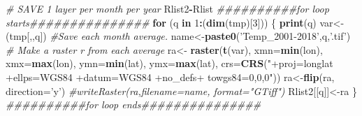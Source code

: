 \documentclass[
  10pt,
  b5paper,
]{book}
\newenvironment{Shaded}{\begin{snugshade}}{\end{snugshade}}
\newcommand{\CommentTok}[1]{\textcolor[rgb]{0.56,0.35,0.01}{\textit{#1}}}
\newcommand{\ControlFlowTok}[1]{\textcolor[rgb]{0.13,0.29,0.53}{\textbf{#1}}}
\newcommand{\DataTypeTok}[1]{\textcolor[rgb]{0.13,0.29,0.53}{#1}}
\newcommand{\DecValTok}[1]{\textcolor[rgb]{0.00,0.00,0.81}{#1}}
\newcommand{\KeywordTok}[1]{\textcolor[rgb]{0.13,0.29,0.53}{\textbf{#1}}}
\newcommand{\NormalTok}[1]{#1}
\newcommand{\OperatorTok}[1]{\textcolor[rgb]{0.81,0.36,0.00}{\textbf{#1}}}
\newcommand{\StringTok}[1]{\textcolor[rgb]{0.31,0.60,0.02}{#1}}
\begin{document}
\begin{Shaded}
\begin{Highlighting}[]
 \CommentTok{# SAVE 1 layer per month per year}
\NormalTok{ Rlist2}\OperatorTok{-}\NormalTok{Rlist}
\CommentTok{##########for loop starts###############}
 \ControlFlowTok{for}\NormalTok{ (q }\ControlFlowTok{in} \DecValTok{1}\OperatorTok{:}\NormalTok{(}\KeywordTok{dim}\NormalTok{(tmp)[}\DecValTok{3}\NormalTok{])) \{}
\KeywordTok{print}\NormalTok{(q)}
\NormalTok{var<-(tmp[,,q])}
 \CommentTok{#Save each month average. }
\NormalTok{ name<-}\KeywordTok{paste0}\NormalTok{(}\StringTok{'Temp_2001-2018'}\NormalTok{,q,}\StringTok{'.tif'}\NormalTok{)}
 \CommentTok{# Make a raster r from each average}
\NormalTok{ra<-}\StringTok{ }\KeywordTok{raster}\NormalTok{(}\KeywordTok{t}\NormalTok{(var), }\DataTypeTok{xmn=}\KeywordTok{min}\NormalTok{(lon), }\DataTypeTok{xmx=}\KeywordTok{max}\NormalTok{(lon), }\DataTypeTok{ymn=}\KeywordTok{min}\NormalTok{(lat), }\DataTypeTok{ymx=}\KeywordTok{max}\NormalTok{(lat), }\DataTypeTok{crs=}\KeywordTok{CRS}\NormalTok{(}\StringTok{"+proj=longlat +ellps=WGS84 +datum=WGS84 +no_defs+ towgs84=0,0,0"}\NormalTok{))}
\NormalTok{ra<-}\KeywordTok{flip}\NormalTok{(ra, }\DataTypeTok{direction=}\StringTok{'y'}\NormalTok{)}
\CommentTok{#writeRaster(ra,filename=name, format="GTiff")}
\NormalTok{Rlist2[[q]]<-ra}
\NormalTok{\}}
\CommentTok{##########for loop ends###############}


\end{Highlighting}
\end{Shaded}
\end{document}
